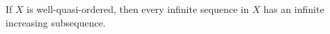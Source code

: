 \begin{corollary}
  \label{WQO_incsubseq} 
  If $X$ is well-quasi-ordered, then every infinite sequence in $X$ has an
  infinite increasing subsequence.
\end{corollary}

  




  



  
  
  
  
  
